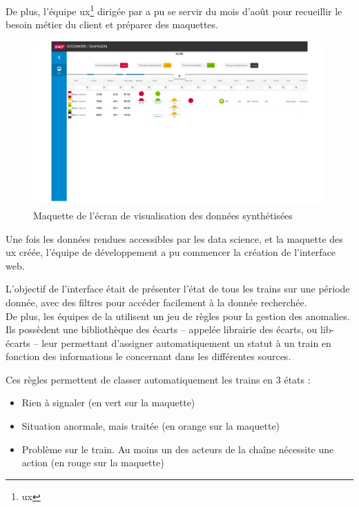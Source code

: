 De plus, l'équipe \gls{ux}\footnote{\glsdesc{ux}} dirigée par \stefan a pu se servir du mois d'août pour recueillir le besoin métier du client et préparer des maquettes.


\begin{figure}[H]
    \centering
    \includegraphics[width=1\linewidth]{img/maquette_home_page.png}
    \caption{Maquette de l'écran de visualisation des données synthétisées}
\end{figure}

Une fois les données rendues accessibles par les data science, et la maquette des \gls{ux} créée, l'équipe de développement a pu commencer la création de l'interface web.

L'objectif de l'interface était de présenter l'état de tous les trains sur une période donnée, avec des filtres pour accéder facilement à la donnée recherchée.\\
De plus, les équipes de la \sncf utilisent un jeu de règles pour la gestion des anomalies. Ils possèdent une bibliothèque des écarts -- appelée \og librairie des écarts, ou lib-écarts -- leur permettant d'assigner automatiquement un statut à un train en fonction des informations le concernant dans les différentes sources.


Ces règles permettent de classer automatiquement les trains en 3 états :

\begin{itemize}
    \item Rien à signaler (en vert sur la maquette)
    \item Situation anormale, mais traitée (en orange sur la maquette)
    \item Problème sur le train. Au moins un des acteurs de la chaîne nécessite une action (en rouge sur la maquette)
\end{itemize}

